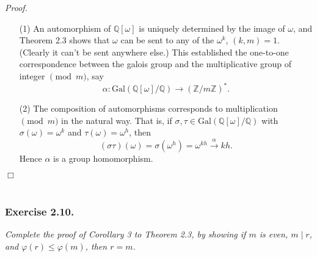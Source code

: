 \documentclass{article}
\begin{document}
\emph{Proof.}
\begin{enumerate}
\item[(1)]
  An automorphism of $\mathbb{Q}[\omega]$ is uniquely determined by the image of $\omega$,
  and Theorem 2.3 shows that $\omega$ can be sent to any of the $\omega^k$, $(k,m) = 1$.
  (Clearly it can't be sent anywhere else.)
  This established the one-to-one correspondence between the galois group and
  the multiplicative group of integer $\pmod m$, say
  \[
    \alpha: \mathrm{Gal}(\mathbb{Q}[\omega]/\mathbb{Q})
    \to (\mathbb{Z}/m\mathbb{Z})^{*}.
  \]

\item[(2)]
  The composition of automorphisms corresponds to multiplication $\pmod m$ in the natural way.
  That is, if $\sigma, \tau \in \mathrm{Gal}(\mathbb{Q}[\omega]/\mathbb{Q})$
  with $\sigma(\omega) = \omega^k$ and $\tau(\omega) = \omega^h$,
  then
  \[
    (\sigma\tau)(\omega) = \sigma(\omega^h) = \omega^{kh}
    \xrightarrow{\alpha} kh.
  \]
  Hence $\alpha$ is a group homomorphism.
\end{enumerate}
$\Box$ \\\\






\subsubsection*{Exercise 2.10.}
\emph{Complete the proof of Corollary 3 to Theorem 2.3,
by showing if $m$ is even, $m \mid r$, and $\varphi(r) \leq \varphi(m)$, then $r = m$.} \\
\end{document}
